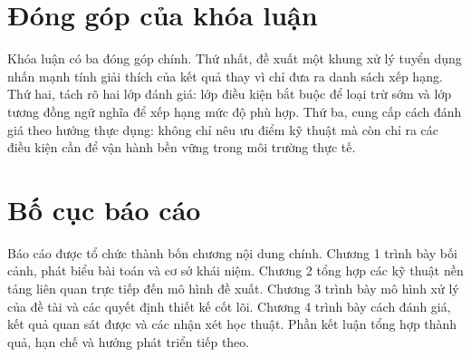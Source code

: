\section*{Đóng góp của khóa luận}

Khóa luận có ba đóng góp chính. Thứ nhất, đề xuất một khung xử lý tuyển dụng nhấn mạnh tính giải thích của kết quả thay vì chỉ đưa ra danh sách xếp hạng. Thứ hai, tách rõ hai lớp đánh giá: lớp điều kiện bắt buộc để loại trừ sớm và lớp tương đồng ngữ nghĩa để xếp hạng mức độ phù hợp. Thứ ba, cung cấp cách đánh giá theo hướng thực dụng: không chỉ nêu ưu điểm kỹ thuật mà còn chỉ ra các điều kiện cần để vận hành bền vững trong môi trường thực tế.

\section*{Bố cục báo cáo}

Báo cáo được tổ chức thành bốn chương nội dung chính. Chương 1 trình bày bối cảnh, phát biểu bài toán và cơ sở khái niệm. Chương 2 tổng hợp các kỹ thuật nền tảng liên quan trực tiếp đến mô hình đề xuất. Chương 3 trình bày mô hình xử lý của đề tài và các quyết định thiết kế cốt lõi. Chương 4 trình bày cách đánh giá, kết quả quan sát được và các nhận xét học thuật. Phần kết luận tổng hợp thành quả, hạn chế và hướng phát triển tiếp theo.
